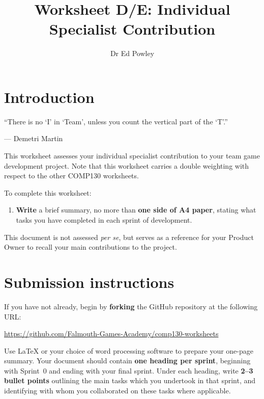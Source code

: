 \documentclass{../../fal_assignment}
\title{Worksheet D/E: Individual Specialist Contribution}
\author{Dr Ed Powley}
\begin{document}
\maketitle

\section*{Introduction}

\begin{marginquote}
``There is no `I' in `Team', unless you count the vertical part of the `T'.''

--- Demetri Martin
\end{marginquote}

This worksheet assesses your individual specialist contribution to your team game
development project.
Note that this worksheet carries a double weighting with respect to the other COMP130 worksheets.

To complete this worksheet:
\begin{enumerate}[label=(\alph*)]
	\item \textbf{Write} a brief summary, no more than \textbf{one side of A4 paper},
		stating what tasks you have completed in each sprint of development.
\end{enumerate}

This document is not assessed \textit{per se}, but serves as a reference for your Product Owner
to recall your main contributions to the project.

\section*{Submission instructions}

If you have not already, begin by \textbf{forking} the GitHub repository at the following URL:

\url{https://github.com/Falmouth-Games-Academy/comp130-worksheets}

Use LaTeX or your choice of word processing software to prepare your one-page summary.
Your document should contain \textbf{one heading per sprint}, beginning with Sprint~0 and ending with your final sprint.
Under each heading, write \textbf{2--3 bullet points} outlining the main tasks which you undertook in that sprint,
and identifying with whom you collaborated on these tasks where applicable.
\end{document}

